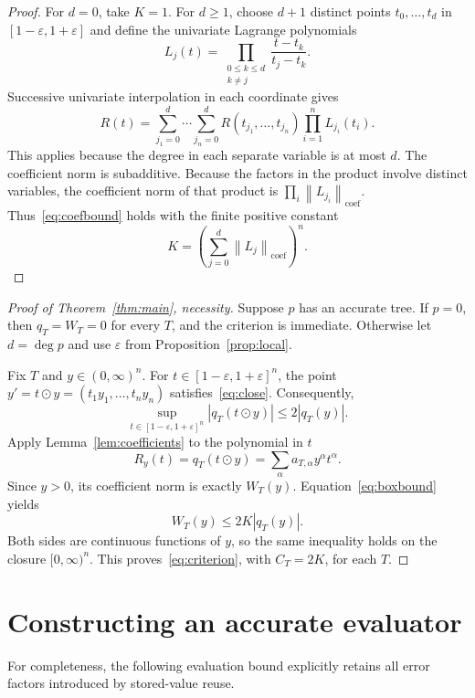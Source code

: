 \documentclass[11pt,a4paper]{article}
\numberwithin{equation}{section}
\theoremstyle{definition}
\theoremstyle{remark}
\newcommand{\abs}[1]{\left|#1\right|}
\newcommand{\coefnorm}[1]{\left\lVert#1\right\rVert_{\mathrm{coef}}}
\begin{document}
\begin{proof}
For $d=0$, take $K=1$.  For $d\ge1$, choose $d+1$ distinct points
$t_0,\ldots,t_d$ in $[1-\varepsilon,1+\varepsilon]$ and define the
univariate Lagrange polynomials
\[
 L_j(t)=\prod_{\substack{0\le k\le d\\k\ne j}}
 \frac{t-t_k}{t_j-t_k}.
\]
Successive univariate interpolation in each coordinate gives
\[
 R(t)=\sum_{j_1=0}^d\cdots\sum_{j_n=0}^d
 R(t_{j_1},\ldots,t_{j_n})\prod_{i=1}^n L_{j_i}(t_i).
\]
This applies because the degree in each separate variable is at most
$d$.  The coefficient norm is subadditive.  Because the factors in the
product involve distinct variables, the coefficient norm of that
product is $\prod_i\coefnorm{L_{j_i}}$.  Thus~\eqref{eq:coefbound} holds
with the finite positive constant
\[
 K=\left(\sum_{j=0}^d\coefnorm{L_j}\right)^n.
\]
\end{proof}

\begin{proof}[Proof of Theorem~\ref{thm:main}, necessity]
Suppose $p$ has an accurate tree.  If $p=0$, then $q_T=W_T=0$ for every
$T$, and the criterion is immediate.  Otherwise let $d=\deg p$ and use
$\varepsilon$ from Proposition~\ref{prop:local}.

Fix $T$ and $y\in(0,\infty)^n$.  For
$t\in[1-\varepsilon,1+\varepsilon]^n$, the point
$y'=t\odot y=(t_1y_1,\ldots,t_ny_n)$ satisfies~\eqref{eq:close}.
Consequently,
\begin{equation}\label{eq:boxbound}
 \sup_{t\in[1-\varepsilon,1+\varepsilon]^n}
 \abs{q_T(t\odot y)}\le2\abs{q_T(y)}.
\end{equation}
Apply Lemma~\ref{lem:coefficients} to the polynomial in $t$
\[
 R_y(t)=q_T(t\odot y)
 =\sum_\alpha a_{T,\alpha}y^\alpha t^\alpha.
\]
Since $y>0$, its coefficient norm is exactly $W_T(y)$.
Equation~\eqref{eq:boxbound} yields
\[
 W_T(y)\le2K\abs{q_T(y)}.
\]
Both sides are continuous functions of $y$, so the same inequality holds
on the closure $[0,\infty)^n$.  This proves~\eqref{eq:criterion}, with
$C_T=2K$, for each $T$.
\end{proof}

\section{Constructing an accurate evaluator}\label{sec:sufficiency}

For completeness, the following evaluation bound explicitly retains all
error factors introduced by stored-value reuse.
\end{document}
